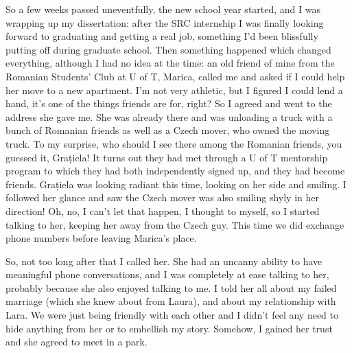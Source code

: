 \documentclass[12pt]{book}
\begin{document}
So a few weeks passed uneventfully, the new school year started, and I
was wrapping up my dissertation: after the SRC internship I was finally
looking forward to graduating and getting a real job, something I'd been
blissfully putting off during graduate school. Then something happened
which changed everything, although I had no idea at the time: an old
friend of mine from the Romanian Students' Club at U of T, Marica,
called me and asked if I could help her move to a new apartment. I'm not
very athletic, but I figured I could lend a hand, it's one of the things
friends are for, right? So I agreed and went to the address she gave me.
She was already there and was unloading a truck with a bunch of Romanian
friends as well as a Czech mover, who owned the moving truck. To my
surprise, who should I see there among the Romanian friends, you guessed
it, Grațiela! It turns out they had met through a U of T mentorship
program to which they had both independently signed up, and they had
become friends. Grațiela was looking radiant this time, looking on her
side and smiling. I followed her glance and saw the Czech mover was also
smiling shyly in her direction! Oh, no, I can't let that happen, I
thought to myself, so I started talking to her, keeping her away from
the Czech guy. This time we did exchange phone numbers before leaving
Marica's place.

So, not too long after that I called her. She had an uncanny ability to
have meaningful phone conversations, and I was completely at ease
talking to her, probably because she also enjoyed talking to me. I told
her all about my failed marriage (which she knew about from Laura), and
about my relationship with Lara. We were just being friendly with each
other and I didn't feel any need to hide anything from her or to
embellish my story. Somehow, I gained her trust and she agreed to meet
in a park.
\end{document}
